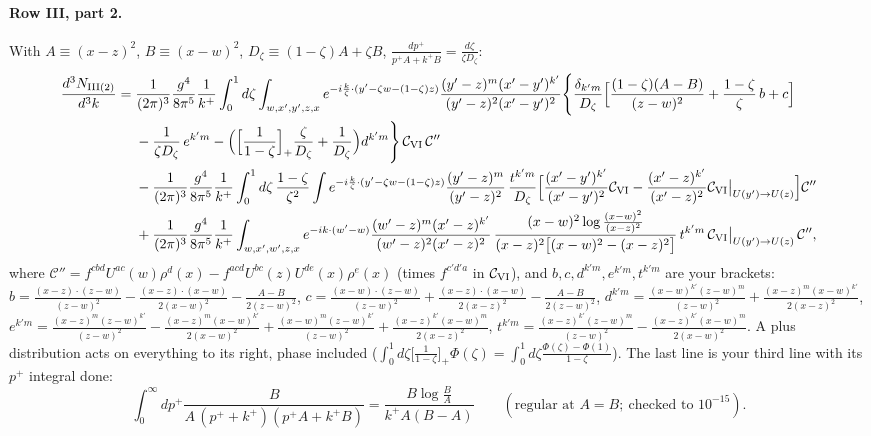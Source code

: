 \documentclass[10pt]{article}
\numberwithin{equation}{section}
\begin{document}
\paragraph{Row III, part 2.} With $A\equiv(x-z)^2$, $B\equiv(x-w)^2$, $D_\zeta\equiv(1-\zeta)A+\zeta B$, $\frac{dp^+}{p^+A+k^+B}=\frac{d\zeta}{\zeta D_\zeta}$:
\begin{align}
\frac{d^3N_{\rm III(2)}}{d^3k}={}&\frac{1}{(2\pi)^3}\frac{g^4}{8\pi^5}\frac1{k^+}\int_0^1d\zeta\int_{w,x',y',z,x}e^{-i\frac{k}{\zeta}\cdot(y'-\zeta w-(1-\zeta)z)}\frac{(y'-z)^m(x'-y')^{k'}}{(y'-z)^2(x'-y')^2}\Bigg\{\frac{\delta_{k'm}}{D_\zeta}\Big[\frac{(1-\zeta)(A-B)}{(z-w)^2}+\frac{1-\zeta}{\zeta}\,b+c\Big]\notag\\
&-\frac{1}{\zeta D_\zeta}\,e^{k'm}-\Big(\Big[\frac{1}{1-\zeta}\Big]_+\frac{\zeta}{D_\zeta}+\frac{1}{D_\zeta}\Big)d^{k'm}\Bigg\}\,\mathcal C_{\rm VI}\,\mathcal C''\notag\\
&-\frac{1}{(2\pi)^3}\frac{g^4}{8\pi^5}\frac1{k^+}\int_0^1d\zeta\,\frac{1-\zeta}{\zeta^2}\int e^{-i\frac{k}{\zeta}\cdot(y'-\zeta w-(1-\zeta)z)}\frac{(y'-z)^m}{(y'-z)^2}\,\frac{t^{k'm}}{D_\zeta}\Big[\frac{(x'-y')^{k'}}{(x'-y')^2}\mathcal C_{\rm VI}-\frac{(x'-z)^{k'}}{(x'-z)^2}\mathcal C_{\rm VI}\big|_{U(y')\to U(z)}\Big]\mathcal C''\notag\\
&+\frac{1}{(2\pi)^3}\frac{g^4}{8\pi^5}\frac{1}{k^+}\int_{w,x',w',z,x}e^{-ik\cdot(w'-w)}\frac{(w'-z)^m(x'-z)^{k'}}{(w'-z)^2(x'-z)^2}\,\frac{(x-w)^2\log\frac{(x-w)^2}{(x-z)^2}}{(x-z)^2\big[(x-w)^2-(x-z)^2\big]}\,t^{k'm}\,\mathcal C_{\rm VI}\big|_{U(y')\to U(z)}\,\mathcal C'',\label{eq:G3III2}
\end{align}
where $\mathcal C''=f^{cbd}U^{ac}(w)\rho^d(x)-f^{acd}U^{bc}(z)U^{de}(x)\rho^e(x)$ (times $f^{c'd'a}$ in $\mathcal C_{\rm VI}$), and $b,c,d^{k'm},e^{k'm},t^{k'm}$ are your brackets: $b=\frac{(x-z)\cdot(z-w)}{(z-w)^2}-\frac{(x-z)\cdot(x-w)}{2(x-w)^2}-\frac{A-B}{2(z-w)^2}$, $c=\frac{(x-w)\cdot(z-w)}{(z-w)^2}+\frac{(x-z)\cdot(x-w)}{2(x-z)^2}-\frac{A-B}{2(z-w)^2}$, $d^{k'm}=\frac{(x-w)^{k'}(z-w)^m}{(z-w)^2}+\frac{(x-z)^m(x-w)^{k'}}{2(x-z)^2}$, $e^{k'm}=\frac{(x-z)^m(z-w)^{k'}}{(z-w)^2}-\frac{(x-z)^m(x-w)^{k'}}{2(x-w)^2}+\frac{(x-w)^m(z-w)^{k'}}{(z-w)^2}+\frac{(x-z)^{k'}(x-w)^m}{2(x-z)^2}$, $t^{k'm}=\frac{(x-z)^{k'}(z-w)^m}{(z-w)^2}-\frac{(x-z)^{k'}(x-w)^m}{2(x-w)^2}$. A plus distribution acts on everything to its right, phase included ($\int_0^1d\zeta\big[\frac1{1-\zeta}\big]_+\Phi(\zeta)=\int_0^1d\zeta\frac{\Phi(\zeta)-\Phi(1)}{1-\zeta}$). The last line is your third line with its $p^+$ integral done:
\begin{equation}
\int_0^\infty dp^+\frac{B}{A\,(p^++k^+)(p^+A+k^+B)}=\frac{B\log\frac BA}{k^+A(B-A)}\qquad(\text{regular at }A=B;\ \text{checked to }10^{-15}).
\end{equation}
\end{document}
